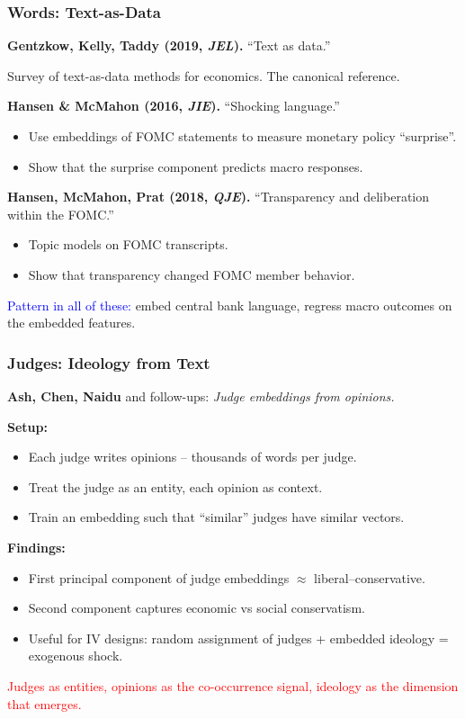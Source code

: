 \documentclass[notes,11pt, aspectratio=169]{beamer}
\begin{document}
\begin{frame}
\frametitle{Words: Text-as-Data}

\textbf{Gentzkow, Kelly, Taddy (2019, \emph{JEL}).} ``Text as data.''

\vspace{4pt}
Survey of text-as-data methods for economics. The canonical reference.

\vspace{8pt}
\textbf{Hansen \& McMahon (2016, \emph{JIE}).} ``Shocking language.''
\begin{itemize}
    \item Use embeddings of FOMC statements to measure monetary policy ``surprise''.
    \item Show that the surprise component predicts macro responses.
\end{itemize}

\vspace{8pt}
\textbf{Hansen, McMahon, Prat (2018, \emph{QJE}).} ``Transparency and deliberation within the FOMC.''
\begin{itemize}
    \item Topic models on FOMC transcripts.
    \item Show that transparency changed FOMC member behavior.
\end{itemize}

\vspace{4pt}
\textcolor{blue}{Pattern in all of these:} embed central bank language, regress macro outcomes on the embedded features.
\end{frame}

\begin{frame}
\frametitle{Judges: Ideology from Text}

\textbf{Ash, Chen, Naidu} and follow-ups: \emph{Judge embeddings from opinions.}

\vspace{6pt}
\textbf{Setup:}
\begin{itemize}
    \item Each judge writes opinions -- thousands of words per judge.
    \item Treat the judge as an entity, each opinion as context.
    \item Train an embedding such that ``similar'' judges have similar vectors.
\end{itemize}

\vspace{8pt}
\textbf{Findings:}
\begin{itemize}
    \item First principal component of judge embeddings $\approx$ liberal--conservative.
    \item Second component captures economic vs social conservatism.
    \item Useful for IV designs: random assignment of judges + embedded ideology = exogenous shock.
\end{itemize}

\vspace{6pt}
\textcolor{red}{Judges as entities, opinions as the co-occurrence signal, ideology as the dimension that emerges.}
\end{frame}
\end{document}

